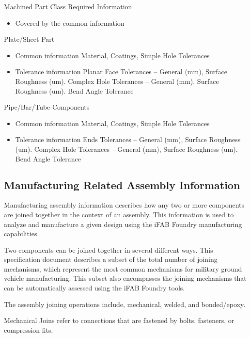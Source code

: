 Machined Part Class Required Information
\begin{itemize}
\item Covered by the common information
\end{itemize}

Plate/Sheet Part
\begin{itemize}
\item Common information
\subitem Material, Coatings, Simple Hole Tolerances
\item Tolerance information
\subitem Planar Face Tolerances – General (mm), Surface Roughness (um).
\subitem Complex Hole Tolerances – General (mm), Surface Roughness (um).
\subitem Bend Angle Tolerance
\end{itemize}

Pipe/Bar/Tube Components
\begin{itemize}
\item Common information
\subitem Material, Coatings, Simple Hole Tolerances
\item Tolerance information
\subitem Ends Tolerances – General (mm), Surface Roughness (um).
\subitem Complex Hole Tolerances – General (mm), Surface Roughness (um).
\subitem Bend Angle Tolerance
\end{itemize}

\subsection{Manufacturing Related Assembly Information}

Manufacturing assembly information describes how any two or more components are joined together in the context of an assembly.  This information is used to analyze and manufacture a given design using the iFAB Foundry manufacturing capabilities.

Two components can be joined together in several different ways.  This specification document describes a subset of the total number of joining mechanisms, which represent the most common mechanisms for military ground vehicle manufacturing.  This subset also encompasses the joining mechanisms that can be automatically assessed using the iFAB Foundry tools.

The assembly joining operations include, mechanical, welded, and bonded/epoxy.

Mechanical Joins refer to connections that are fastened by bolts, fasteners, or compression fits.

